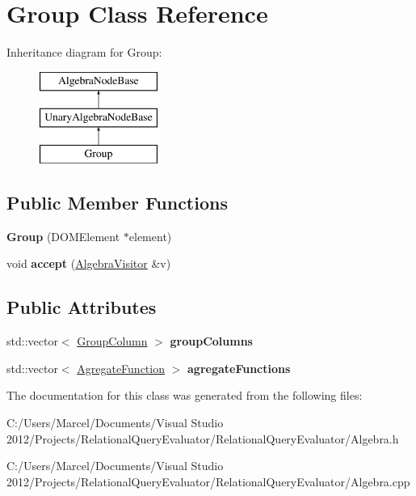 \hypertarget{class_group}{\section{Group Class Reference}
\label{class_group}
}
Inheritance diagram for Group\+:\begin{figure}[H]
\begin{center}
\leavevmode
\includegraphics[height=3.000000cm]{class_group}
\end{center}
\end{figure}
\subsection*{Public Member Functions}
\begin{DoxyCompactItemize}
\item 
\hypertarget{class_group_ae331a9b7095f8c2481e2031d41d88164}{{\bfseries Group} (D\+O\+M\+Element $\ast$element)}\label{class_group_ae331a9b7095f8c2481e2031d41d88164}

\item 
\hypertarget{class_group_a5286b05dd9be36f3a76d075a43191184}{void {\bfseries accept} (\hyperlink{class_algebra_visitor}{Algebra\+Visitor} \&v)}\label{class_group_a5286b05dd9be36f3a76d075a43191184}

\end{DoxyCompactItemize}
\subsection*{Public Attributes}
\begin{DoxyCompactItemize}
\item 
\hypertarget{class_group_a811076e176eaa4e3bb8373b7bd515c7e}{std\+::vector$<$ \hyperlink{class_group_column}{Group\+Column} $>$ {\bfseries group\+Columns}}\label{class_group_a811076e176eaa4e3bb8373b7bd515c7e}

\item 
\hypertarget{class_group_afd02ca31d700990cddc2860d562635c2}{std\+::vector$<$ \hyperlink{class_agregate_function}{Agregate\+Function} $>$ {\bfseries agregate\+Functions}}\label{class_group_afd02ca31d700990cddc2860d562635c2}

\end{DoxyCompactItemize}


The documentation for this class was generated from the following files\+:\begin{DoxyCompactItemize}
\item 
C\+:/\+Users/\+Marcel/\+Documents/\+Visual Studio 2012/\+Projects/\+Relational\+Query\+Evaluator/\+Relational\+Query\+Evaluator/Algebra.\+h\item 
C\+:/\+Users/\+Marcel/\+Documents/\+Visual Studio 2012/\+Projects/\+Relational\+Query\+Evaluator/\+Relational\+Query\+Evaluator/Algebra.\+cpp\end{DoxyCompactItemize}
